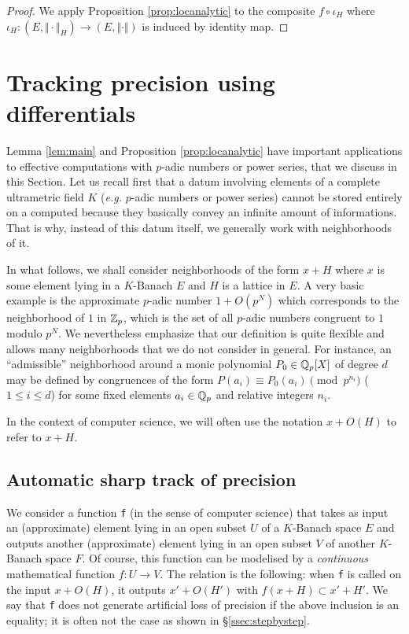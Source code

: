 \documentclass{lms}
\begin{document}
\begin{proof}
We apply Proposition \ref{prop:locanalytic} to the composite $f \circ 
\iota_H$ where $\iota_H : (E, \Vert \cdot \Vert_H) \to (E, \Vert \cdot 
\Vert)$ is induced by identity map.
\end{proof}

\section{Tracking precision using differentials}
\label{sec:tracking}

Lemma \ref{lem:main} and Proposition \ref{prop:locanalytic} have 
important applications to effective computations with $p$-adic numbers 
or power series, that we discuss in this Section. Let us recall first 
that a datum involving elements of a complete ultrametric field $K$ 
(\emph{e.g.} $p$-adic numbers or power series) cannot be stored entirely 
on a computed because they basically convey an infinite amount of 
informations. That is why, instead of this datum itself, we generally 
work with neighborhoods of it.

In what follows, we shall consider neighborhoods of the form $x + H$ 
where $x$ is some element lying in a $K$-Banach $E$ and $H$ is a lattice 
in $E$. A very basic example is the approximate $p$-adic number $1 + 
O(p^N)$ which corresponds to the neighborhood of $1$ in $\mathbb Z_p$, which is 
the set of all $p$-adic numbers congruent to $1$ modulo $p^N$. We 
nevertheless emphasize that our definition is quite flexible and allows 
many neighborhoods that we do not consider in general. For instance, an 
``admissible'' neighborhood around a monic polynomial $P_0 \in \mathbb Q_p[X]$ 
of degree $d$ may be defined by congruences of the form $P(a_i) \equiv 
P_0(a_i) \pmod {p^{n_i}}$ ($1 \leq i \leq d$) for some fixed elements 
$a_i \in \mathbb Q_p$ and relative integers $n_i$.

In the context of computer science, we will often use the notation $x + 
O(H)$ to refer to $x + H$.

\subsection{Automatic sharp track of precision}

We consider a function {\tt f} (in the sense of computer 
science) that takes as input an (approximate) element lying in an open 
subset $U$ of a $K$-Banach space $E$ and outputs another (approximate) 
element lying in an open subset $V$ of another $K$-Banach space $F$. Of 
course, this function can be modelised by a \emph{continuous} 
mathematical function $f : U \to V$. The relation is the following: when 
{\tt f} is called on the input $x + O(H)$, it outputs $x' + O(H')$ with 
$f(x+H) \subset x' + H'$. We say that {\tt f} does not generate 
artificial loss of precision if the above inclusion is an equality; it is 
often not the case as shown in \S \ref{ssec:stepbystep}.
\end{document}
